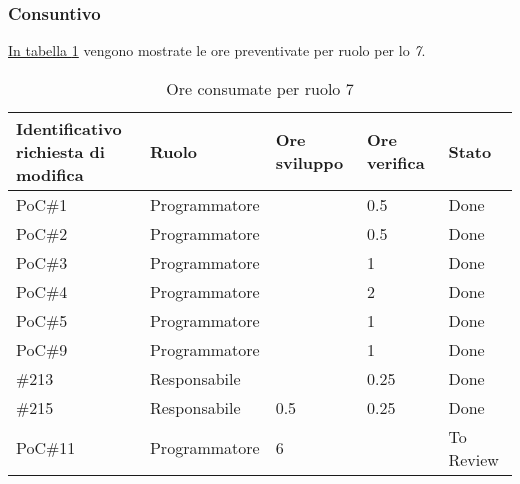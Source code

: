 \subsubsection{Consuntivo}
\hyperref[tab:sprint7_ore_consumate]{In tabella \ref{tab:sprint7_ore_consumate}} vengono mostrate le ore preventivate per ruolo per lo \textit{ 7}.

\begin{table}[H]
    \centering
    \begin{tabular}{| l | l | l | l | l |}
        \hline
            \makecell{\textbf{Identificativo} \\ \textbf{richiesta di modifica}} &
            \textbf{Ruolo} &
            \textbf{Ore sviluppo} &
            \textbf{Ore verifica} &
            \textbf{Stato}\\
        \hline
        PoC\#1 & Programmatore &  & 0.5 & Done\\
        \hline
        PoC\#2 & Programmatore &  & 0.5 & Done\\
        \hline
        PoC\#3 & Programmatore &  & 1 & Done\\
        \hline
        PoC\#4 & Programmatore &  & 2 & Done\\
        \hline
        PoC\#5 & Programmatore &  & 1 & Done\\
        \hline
        PoC\#9 & Programmatore &  & 1 & Done\\
        \hline
        \#213 & Responsabile &  & 0.25 & Done\\
        \hline
        \#215 & Responsabile & 0.5 & 0.25 & Done\\
        \hline
        PoC\#11 & Programmatore & 6 & & To Review\\
        \hline
    \end{tabular}
    \caption{Ore consumate per ruolo  7}
    \label{tab:sprint7_ore_consumate} 
\end{table}
